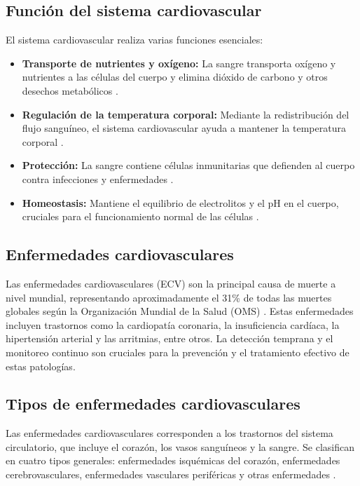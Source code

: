 \subsection{Función del sistema cardiovascular}

El sistema cardiovascular realiza varias funciones esenciales:
\begin{itemize}
    \item \textbf{Transporte de nutrientes y oxígeno:} La sangre transporta oxígeno y nutrientes a las células del cuerpo y elimina dióxido de carbono y otros desechos metabólicos \cite{sistema_cardiovascular}.
    \item \textbf{Regulación de la temperatura corporal:} Mediante la redistribución del flujo sanguíneo, el sistema cardiovascular ayuda a mantener la temperatura corporal \cite{sistema_cardiovascular}.
    \item \textbf{Protección:} La sangre contiene células inmunitarias que defienden al cuerpo contra infecciones y enfermedades \cite{guyton2006text}.
    \item \textbf{Homeostasis:} Mantiene el equilibrio de electrolitos y el pH en el cuerpo, cruciales para el funcionamiento normal de las células \cite{guyton2006text}.
\end{itemize}

\subsection{Enfermedades cardiovasculares}

Las enfermedades cardiovasculares (ECV) son la principal causa de muerte a nivel mundial, representando aproximadamente el 31\% de todas las muertes globales según la Organización Mundial de la Salud (OMS) \cite{who-cvd}. Estas enfermedades incluyen trastornos como la cardiopatía coronaria, la insuficiencia cardíaca, la hipertensión arterial y las arritmias, entre otros. La detección temprana y el monitoreo continuo son cruciales para la prevención y el tratamiento efectivo de estas patologías.

\subsection{Tipos de enfermedades cardiovasculares}

Las enfermedades cardiovasculares corresponden a los trastornos del sistema circulatorio, que incluye el corazón, los vasos sanguíneos y la sangre. Se clasifican en cuatro tipos generales: enfermedades isquémicas del corazón, enfermedades cerebrovasculares, enfermedades vasculares periféricas y otras enfermedades \cite{corella2007enfermedades}.

